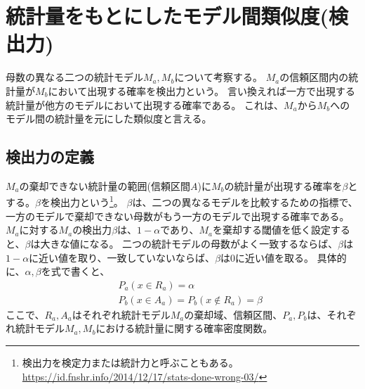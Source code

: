 \section{統計量をもとにしたモデル間類似度(検出力)}
母数の異なる二つの統計モデル$M_a,M_b$について考察する。
$M_a$の信頼区間内の統計量が$M_b$において出現する確率を検出力という。
言い換えれば一方で出現する統計量が他方のモデルにおいて出現する確率である。
これは、$M_a$から$M_b$へのモデル間の統計量を元にした類似度と言える。

\subsection{検出力の定義}
$M_a$の棄却できない統計量の範囲(信頼区間$A$)に$M_b$の統計量が出現する確率を$\beta$とする。$\beta$を検出力という\footnote{検出力を検定力または統計力と呼ぶこともある。\\ \url{https://id.fnshr.info/2014/12/17/stats-done-wrong-03/}}。
$\beta$は、二つの異なるモデルを比較するための指標で、一方のモデルで棄却できない母数がもう一方のモデルで出現する確率である。
$M_a$に対する$M_a$の検出力$\beta$は、$1-\alpha$であり、$M_a$を棄却する閾値を低く設定すると、$\beta$は大きな値になる。
二つの統計モデルの母数がよく一致するならば、$\beta$は$1-\alpha$に近い値を取り、一致していないならば、$\beta$は0に近い値を取る。
具体的に、$\alpha,\beta$を式で書くと、
\begin{eqnarray*}
    & &P_a(x \in R_a) = \alpha\\
    & & P_b(x \in A_a) = P_b(x\notin R_a )=\beta
\end{eqnarray*}
ここで、$R_a,A_a$はそれぞれ統計モデル$M_a$の棄却域、信頼区間、$P_a,P_b$は、それぞれ統計モデル$M_a,M_b$における統計量に関する確率密度関数。


